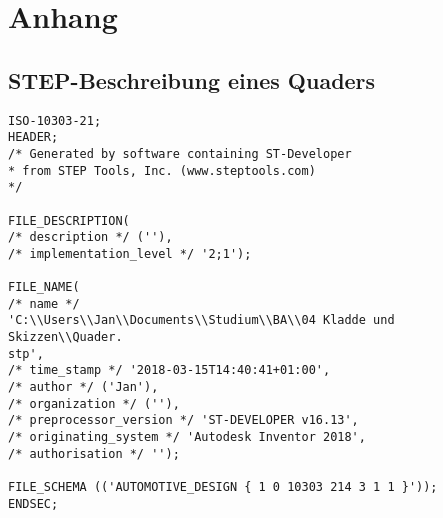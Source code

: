 \section{Anhang}

\subsection{STEP-Beschreibung eines Quaders}
\label{sec:anhang}

\begin{lstlisting}[captionpos=b, style=customc, caption=Beschreibung eines Quaders in STEP, label=lis:simplestpanh]
ISO-10303-21;
HEADER;
/* Generated by software containing ST-Developer
* from STEP Tools, Inc. (www.steptools.com) 
*/

FILE_DESCRIPTION(
/* description */ (''),
/* implementation_level */ '2;1');

FILE_NAME(
/* name */ 
'C:\\Users\\Jan\\Documents\\Studium\\BA\\04 Kladde und Skizzen\\Quader.
stp',
/* time_stamp */ '2018-03-15T14:40:41+01:00',
/* author */ ('Jan'),
/* organization */ (''),
/* preprocessor_version */ 'ST-DEVELOPER v16.13',
/* originating_system */ 'Autodesk Inventor 2018',
/* authorisation */ '');

FILE_SCHEMA (('AUTOMOTIVE_DESIGN { 1 0 10303 214 3 1 1 }'));
ENDSEC;


\end{lstlisting}
